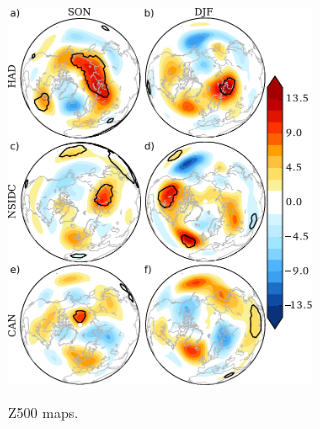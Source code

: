 \documentclass[twocol]{ametsoc}
\begin{document}
\begin{figure}[t]
  \noindent\includegraphics[width=19pc,angle=0]{GZ500maps.pdf}\\
  \caption{Z500 maps.
}\label{fig:fig3c}
\end{figure}
\end{document}
